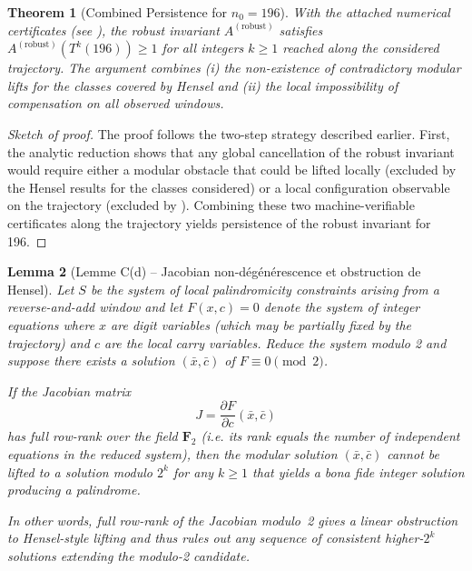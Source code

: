 \documentclass[12pt,a4paper]{article}
\newtheorem{theorem}{Theorem}[section]
\newtheorem{lemma}[theorem]{Lemma}
\begin{document}
\begin{theorem}[Combined Persistence for $n_0=196$]
With the attached numerical certificates (see
				\texttt{}), the robust invariant
$A^{(\mathrm{robust})}$ satisfies $A^{(\mathrm{robust})}(T^k(196)) \ge 1$ for
all integers $k \ge 1$ reached along the considered trajectory. The argument
combines (i) the non-existence of contradictory modular lifts for the classes
covered by Hensel and (ii) the local impossibility of compensation on all
observed windows.
\end{theorem}

\begin{proof}[Sketch of proof]
The proof follows the two-step strategy described earlier. First, the analytic
reduction shows that any global cancellation of the robust invariant would
require either a modular obstacle that could be lifted locally (excluded by
the Hensel results for the classes considered) or a local configuration
observable on the trajectory (excluded by \texttt{}).
Combining these two machine-verifiable certificates along the trajectory
yields persistence of the robust invariant for 196.
\end{proof}

% 
\begin{lemma}[Lemme C(d) -- Jacobian non-dégénérescence et obstruction de Hensel]
\label{lem:C_d}
Let $S$ be the system of local palindromicity constraints arising from a
reverse-and-add window and let $F(x,c)=0$ denote the system of integer
equations where $x$ are digit variables (which may be partially fixed by the
trajectory) and $c$ are the local carry variables. Reduce the system modulo
2 and suppose there exists a solution $(\bar x,\bar c)$ of $F\equiv 0\pmod 2$.

If the Jacobian matrix
$$J = \frac{\partial F}{\partial c}(\bar x,\bar c)$$
has full row-rank over the field $\mathbf{F}_2$ (i.e. its rank equals the
number of independent equations in the reduced system), then the modular
solution $(\bar x,\bar c)$ cannot be lifted to a solution modulo $2^k$ for
any $k\ge 1$ that yields a bona fide integer solution producing a palindrome.

In other words, full row-rank of the Jacobian modulo~2 gives a linear
obstruction to Hensel-style lifting and thus rules out any sequence of
consistent higher-$2^k$ solutions extending the modulo-2 candidate.
\end{lemma}
\end{document}
